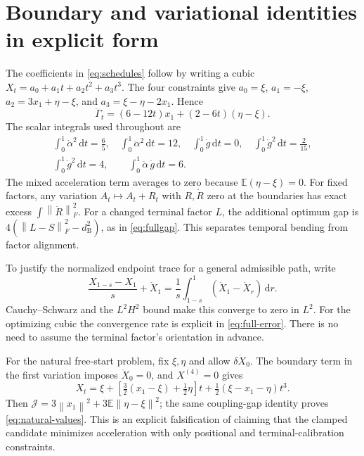 \documentclass[11pt,letterpaper]{article}
\newcommand{\E}{\mathbb E}
\newcommand{\dd}{\,\mathrm d}
\newcommand{\norm}[1]{\left\lVert#1\right\rVert}
\newcommand{\bures}{d_{\mathrm B}}
\newcommand{\J}{\mathcal J}
\begin{document}
\appendix
\section{Boundary and variational identities in explicit form}
\label{app:identities}

The coefficients in \eqref{eq:schedules} follow by writing a cubic $X_t=a_0+a_1t+a_2t^2+a_3t^3$. The four constraints give $a_0=\xi$, $a_1=-\xi$, $a_2=3x_1+\eta-\xi$, and $a_3=\xi-\eta-2x_1$. Hence
\begin{equation}
\ddot\Gamma_t=(6-12t)x_1+(2-6t)(\eta-\xi).
\end{equation}
The scalar integrals used throughout are
\begin{equation}
\begin{gathered}
\int_0^1\dot\alpha^2\dd t=\frac65,\quad
\int_0^1\ddot\alpha^2\dd t=12,\quad
\int_0^1\dot g\dd t=0,\quad
\int_0^1\dot g^2\dd t=\frac{2}{15},\\
\int_0^1\ddot g^2\dd t=4,\qquad
\int_0^1\ddot\alpha\,\ddot g\dd t=6.
\end{gathered}
\end{equation}
The mixed acceleration term averages to zero because $\E(\eta-\xi)=0$. For fixed factors, any variation $A_t\mapsto A_t+R_t$ with $R,\dot R$ zero at the boundaries has exact excess $\int\norm{\ddot R}_F^2$. For a changed terminal factor $L$, the additional optimum gap is $4(\norm{L-S}_F^2-\bures^2)$, as in \eqref{eq:fullgap}. This separates temporal bending from factor alignment.

To justify the normalized endpoint trace for a general admissible path, write
\begin{equation}
\frac{X_{1-s}-X_1}{s}+\dot X_1
=\frac1s\int_{1-s}^1(\dot X_1-\dot X_r)\dd r.
\end{equation}
Cauchy--Schwarz and the $L^2H^2$ bound make this converge to zero in $L^2$. For the optimizing cubic the convergence rate is explicit in \eqref{eq:full-error}. There is no need to assume the terminal factor's orientation in advance.

For the natural free-start problem, fix $\xi,\eta$ and allow $\delta\dot X_0$. The boundary term in the first variation imposes $\ddot X_0=0$, and $X^{(4)}=0$ gives
\begin{equation}
X_t=\xi+\left[\tfrac32(x_1-\xi)+\tfrac12\eta\right]t
+\tfrac12(\xi-x_1-\eta)t^3.
\end{equation}
Then $\J=3\norm{x_1}^2+3\E\norm{\eta-\xi}^2$; the same coupling-gap identity proves \eqref{eq:natural-values}. This is an explicit falsification of claiming that the clamped candidate minimizes acceleration with only positional and terminal-calibration constraints.
\end{document}
